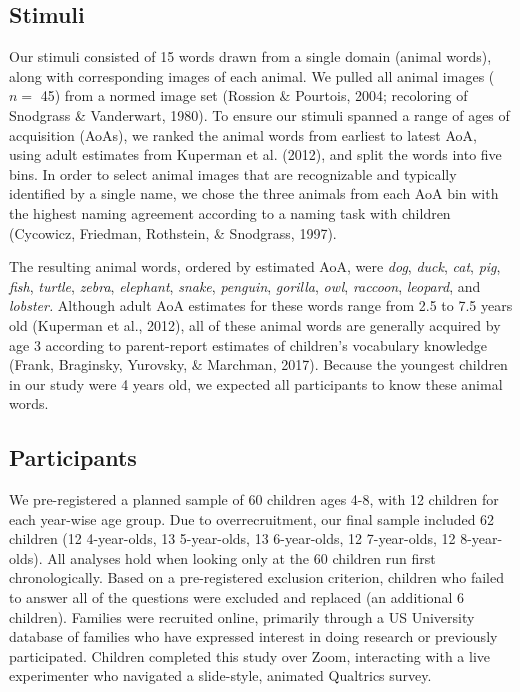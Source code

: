 \documentclass[10pt, letterpaper]{article}
\begin{document}
\hypertarget{stimuli}{%
\subsection{Stimuli}\label{stimuli}}

Our stimuli consisted of 15 words drawn from a single domain (animal
words), along with corresponding images of each animal. We pulled all
animal images (\(n =\) 45) from a normed image set (Rossion \& Pourtois,
2004; recoloring of Snodgrass \& Vanderwart, 1980). To ensure our
stimuli spanned a range of ages of acquisition (AoAs), we ranked the
animal words from earliest to latest AoA, using adult estimates from
Kuperman et al. (2012), and split the words into five bins. In order to
select animal images that are recognizable and typically identified by a
single name, we chose the three animals from each AoA bin with the
highest naming agreement according to a naming task with children
(Cycowicz, Friedman, Rothstein, \& Snodgrass, 1997).

The resulting animal words, ordered by estimated AoA, were \emph{dog},
\emph{duck}, \emph{cat}, \emph{pig}, \emph{fish}, \emph{turtle},
\emph{zebra}, \emph{elephant}, \emph{snake}, \emph{penguin},
\emph{gorilla}, \emph{owl}, \emph{raccoon}, \emph{leopard}, and
\emph{lobster.} Although adult AoA estimates for these words range from
2.5 to 7.5 years old (Kuperman et al., 2012), all of these animal words
are generally acquired by age 3 according to parent-report estimates of
children's vocabulary knowledge (Frank, Braginsky, Yurovsky, \&
Marchman, 2017). Because the youngest children in our study were 4 years
old, we expected all participants to know these animal words.

\hypertarget{participants}{%
\subsection{Participants}\label{participants}}

We pre-registered a planned sample of 60 children ages 4-8, with 12
children for each year-wise age group. Due to overrecruitment, our final
sample included 62 children (12 4-year-olds, 13 5-year-olds, 13
6-year-olds, 12 7-year-olds, 12 8-year-olds). All analyses hold when
looking only at the 60 children run first chronologically. Based on a
pre-registered exclusion criterion, children who failed to answer all of
the questions were excluded and replaced (an additional 6 children).
Families were recruited online, primarily through a US University
database of families who have expressed interest in doing research or
previously participated. Children completed this study over Zoom,
interacting with a live experimenter who navigated a slide-style,
animated Qualtrics survey.
\end{document}

